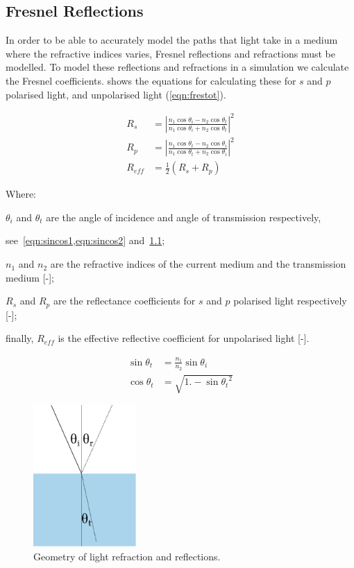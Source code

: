 \begin{appendices}
\chapter{Fresnel Reflections}
\label{app:fresnelappend}

In order to be able to accurately model the paths that light take in a medium where the refractive indices varies, Fresnel reflections and refractions must be modelled.
To model these reflections and refractions in a simulation we calculate the Fresnel coefficients.
 shows the equations for calculating these for $s$ and $p$ polarised light, and unpolarised light (\cref{eqn:frestot}).


\begin{align}
R_s&=\left|\frac{n_1 \cos\theta_i-n_2\cos\theta_t}{n_1\cos\theta_i+n_2\cos\theta_t}\right|^2\label{eqn:fres1}\\
R_p&=\left|\frac{n_1 \cos\theta_t-n_2\cos\theta_i}{n_1\cos\theta_t+n_2\cos\theta_i}\right|^2\label{eqn:fres2}\\
R_{eff}&=\tfrac{1}{2}\left(R_s+R_p\right)\label{eqn:frestot}
\end{align}

\noindent Where: 

\indent $\theta_i$ and $\theta_t$ are the angle of incidence and angle of transmission respectively,

\indent see~\cref{eqn:sincos1,eqn:sincos2} and~\cref{fig:fresnelfig};

\indent $n_1$ and $n_2$ are the refractive indices of the current medium and the transmission medium [-];

\indent $R_s$ and $R_p$ are the reflectance coefficients for $s$ and $p$ polarised light respectively [-];

\indent finally, $R_{eff}$ is the effective reflective coefficient for unpolarised light [-].

\medskip

\begin{align}
\sin\theta_t&=\frac{n_1}{n_2}\sin\theta_i\label{eqn:sincos1}\\
\cos\theta_t&=\sqrt{1. - {\sin\theta_t}^2}\label{eqn:sincos2}
\end{align}


\begin{figure}[!htpb]
    \centering
    \includegraphics[width=0.35\textwidth]{fresnel.pdf}
    \caption{Geometry of light refraction and reflections.}
    \label{fig:fresnelfig}
\end{figure}


\end{appendices}
